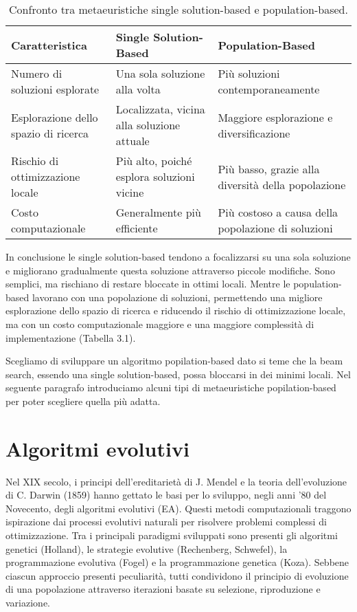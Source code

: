\begin{table}[h!]
    \centering
    \renewcommand{\arraystretch}{1.7}
    \begin{tabular}{|>{\raggedright\arraybackslash}p{4cm}|>{\raggedright\arraybackslash}p{4cm}|>{\raggedright\arraybackslash}p{4cm}|}
    \hline
    \textbf{Caratteristica} & \textbf{Single Solution-Based} & \textbf{Population-Based} \\ \hline
    Numero di soluzioni esplorate & Una sola soluzione alla volta & Più soluzioni contemporaneamente \\ \hline
    Esplorazione dello spazio di ricerca & Localizzata, vicina alla soluzione attuale & Maggiore esplorazione e diversificazione \\ \hline
    Rischio di ottimizzazione locale & Più alto, poiché esplora soluzioni vicine & Più basso, grazie alla diversità della popolazione \\ \hline
    Costo computazionale & Generalmente più efficiente & Più costoso a causa della popolazione di soluzioni \\ \hline
    \end{tabular}
    \caption{Confronto tra metaeuristiche single solution-based e population-based.}
    \label{tab:comparison}
\end{table}

In conclusione le single solution-based tendono a focalizzarsi su una sola soluzione e migliorano gradualmente questa soluzione attraverso piccole modifiche. Sono semplici, ma rischiano di restare bloccate in ottimi locali. Mentre le population-based lavorano con una popolazione di soluzioni, permettendo una migliore esplorazione dello spazio di ricerca e riducendo il rischio di ottimizzazione locale, ma con un costo computazionale maggiore e una maggiore complessità di implementazione (Tabella 3.1).

Scegliamo di sviluppare un algoritmo popilation-based dato si teme che la beam search, essendo una single solution-based, possa bloccarsi in dei minimi locali. Nel seguente paragrafo introduciamo alcuni tipi di metaeuristiche popilation-based per poter scegliere quella più adatta.

\section{Algoritmi evolutivi}

Nel XIX secolo, i principi dell'ereditarietà di J. Mendel e la teoria dell'evoluzione di C. Darwin (1859) hanno gettato le basi per lo sviluppo, negli anni '80 del Novecento, degli algoritmi evolutivi (EA). Questi metodi computazionali traggono ispirazione dai processi evolutivi naturali per risolvere problemi complessi di ottimizzazione. Tra i principali paradigmi sviluppati sono presenti gli algoritmi genetici (Holland), le strategie evolutive (Rechenberg, Schwefel), la programmazione evolutiva (Fogel) e la programmazione genetica (Koza). Sebbene ciascun approccio presenti peculiarità, tutti condividono il principio di evoluzione di una popolazione attraverso iterazioni basate su selezione, riproduzione e variazione.

